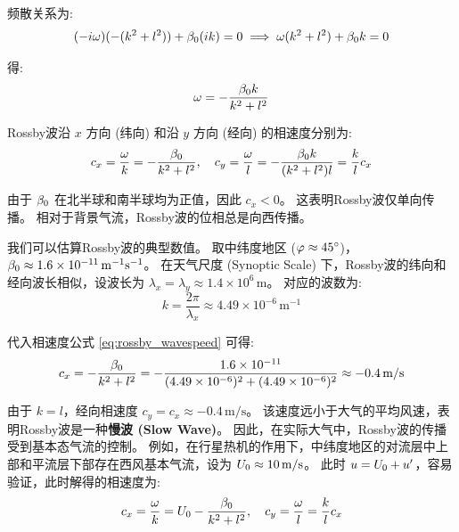 频散关系为:
\begin{equation*}
    (-i \omega)(-(k^2 + l^2)) + \beta_0 (i k) = 0 \implies \omega (k^2 + l^2) + \beta_0 k = 0
\end{equation*}

得:
\begin{equation}
    \omega = -\frac{\beta_0 k}{k^2 + l^2}
    \label{eq:dispersion_relation_rossby}
\end{equation}

Rossby波沿 $x$ 方向 (纬向) 和沿 $y$ 方向 (经向) 的相速度分别为:
\begin{equation}
    c_x = \frac{\omega}{k} = -\frac{\beta_0}{k^2 + l^2}, \quad c_y = \frac{\omega}{l} = -\frac{\beta_0 k}{(k^2 + l^2) l} = \frac{k}{l} c_x
    \label{eq:rossby_wavespeed}
\end{equation}

由于 $\beta_0$ 在北半球和南半球均为正值，因此 $c_x < 0$。
这表明Rossby波仅单向传播。
相对于背景气流，Rossby波的位相总是向西传播。

我们可以估算Rossby波的典型数值。
取中纬度地区 ($\varphi \approx 45^\circ$)，$\beta_0 \approx 1.6 \times 10^{-11}\,\mathrm{m^{-1} s^{-1}}$。
在天气尺度 (Synoptic Scale) 下，Rossby波的纬向和经向波长相似，设波长为 $\lambda_x = \lambda_y \approx 1.4 \times 10^6\,\mathrm{m}$。
对应的波数为:
\begin{equation*}
    k = \frac{2\pi}{\lambda_x} \approx 4.49 \times 10^{-6}\,\mathrm{m^{-1}}
\end{equation*}

代入相速度公式 \eqref{eq:rossby_wavespeed} 可得:
\begin{equation*}
    c_x = -\frac{\beta_0}{k^2 + l^2} = -\frac{1.6 \times 10^{-11}}{ (4.49 \times 10^{-6})^2 + (4.49 \times 10^{-6})^2} \approx -0.4\,\mathrm{m/s}
\end{equation*}

由于 $k = l$，经向相速度 $c_y = c_x \approx -0.4\,\mathrm{m/s}$。
该速度远小于大气的平均风速，表明Rossby波是一种\textbf{慢波 (Slow Wave)}。
因此，在实际大气中，Rossby波的传播受到基本态气流的控制。
例如，在行星热机的作用下，中纬度地区的对流层中上部和平流层下部存在西风基本气流，设为 $U_0 \approx 10\,\mathrm{m/s}$。
此时 $u = U_0 + u^\prime$，容易验证，此时解得的相速度为:
\begin{equation}
    c_x = \frac{\omega}{k} = U_0 - \frac{\beta_0}{k^2 + l^2}, \quad c_y = \frac{\omega}{l} = \frac{k}{l} c_x
    \label{eq:rossby_wavespeed_background}
\end{equation}


